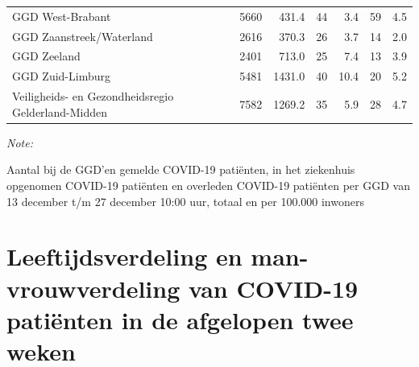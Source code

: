 \documentclass[
  english,
  man,floatsintext]{apa6}
\begin{document}
\begin{table}[H]
\begin{threeparttable}
\begin{tabular}{lrrrrrr}
GGD West-Brabant & 5660 & 431.4 & 44 & 3.4 & 59 & 4.5\\
GGD Zaanstreek/Waterland & 2616 & 370.3 & 26 & 3.7 & 14 & 2.0\\
GGD Zeeland & 2401 & 713.0 & 25 & 7.4 & 13 & 3.9\\
GGD Zuid-Limburg & 5481 & 1431.0 & 40 & 10.4 & 20 & 5.2\\
Veiligheids- en Gezondheidsregio Gelderland-Midden & 7582 & 1269.2 & 35 & 5.9 & 28 & 4.7\\
\bottomrule
\end{tabular}
\begin{tablenotes}
\item \textit{Note: } 
\item Aantal bij de GGD’en gemelde COVID-19 patiënten, in het ziekenhuis opgenomen COVID-19 patiënten en overleden COVID-19 patiënten per GGD van 13 december t/m 27 december 10:00 uur, totaal en per 100.000 inwoners
\end{tablenotes}
\end{threeparttable}
\endgroup{}
\end{table}

\newpage

\hypertarget{leeftijdsverdeling-en-man-vrouwverdeling-van-covid-19-patiuxebnten-in-de-afgelopen-twee-weken}{%
\section{Leeftijdsverdeling en man-vrouwverdeling van COVID-19 patiënten in de afgelopen twee weken}\label{leeftijdsverdeling-en-man-vrouwverdeling-van-covid-19-patiuxebnten-in-de-afgelopen-twee-weken}}
\end{document}

